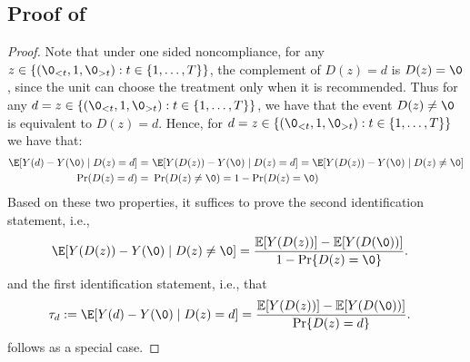\subsection{Proof of }
\begin{proof} Note that under one sided noncompliance, for any $z\in \{(\0_{<t}, 1, \0_{>t}): t\in \{1, \ldots, T\}\}$, the complement of $D(z)=d$ is $D(z)=\0$, since the unit can choose the treatment only when it is recommended. Thus for any $d=z\in \{(\0_{<t}, 1, \0_{>t}): t\in \{1, \ldots, T\}\}$, we have that the event $D(z)\neq \0$ is equivalent to $D(z)=d$. Hence, for $d=z\in \{(\0_{<t}, 1, \0_{>t}): t\in \{1, \ldots, T\}\}$ we have that:
\begin{align*}
    \E[Y(d)-Y(\0)\mid D(z)=d]=~& \E[Y(D(z)) - Y(\0)\mid D(z)=d] = \E[Y(D(z)) - Y(\0)\mid D(z)\neq \0]\\
    \Pr(D(z)=d) =~& \Pr(D(z)\neq \0) = 1 - \Pr(D(z)=\0) 
\end{align*}
Based on these two properties, it suffices to prove the second identification statement, i.e., 
\begin{align*}
    \E[Y(D(z)) - Y(\0) &\mid D(z) \neq \0]
 =\frac{
    \mathbb{E}[ Y(D(z)) ]
    - \mathbb{E}[ Y(D(\0)) ]
  }{1 - \Pr\{ D(z)=\0 \}
  }.
\end{align*}
and the first identification statement, i.e., that
\begin{align*}
    \tau_d := \E[Y(d) - Y(\0) &\mid D(z)=d]
 =\frac{
    \mathbb{E}[Y(D(z)) ]
    - \mathbb{E}[Y(D(\0)) ]
  }{\Pr\{ D(z)=d \}
  }.
\end{align*}
follows as a special case.


\end{proof}

